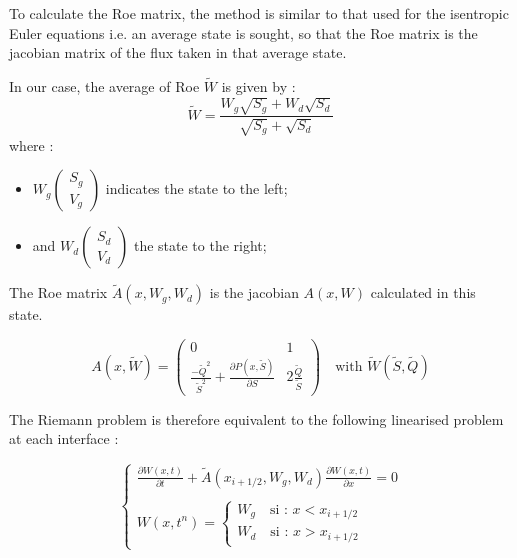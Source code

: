 To calculate the Roe matrix, the method is similar to that used for the isentropic Euler equations i.e. an average state is sought, so that the Roe matrix is the jacobian matrix of the flux taken in that average state.

In our case, the average of Roe $\tilde W$ is given by :
\begin{equation}
 \tilde W = \frac{W_g \sqrt{S_g} + W_d \sqrt{S_d}}{\sqrt{S_g} + \sqrt{S_d}}
\end{equation}
where :
\begin{itemize}
 \item $W_g \left ( \begin{array}{c}
    S_g\\
    V_g
    \end{array} \right )$ indicates the state to the left;
 \item and $W_d \left ( \begin{array}{c}
    S_d\\
    V_d
    \end{array} \right )$ the state to the right;
\end{itemize}

The Roe matrix $\tilde A (x,W_g,W_d)$ is the jacobian $A(x,W)$ calculated in this state.

\begin{equation}
 A(x,\tilde W) = \left ( \begin{array}{cc}
       0 & 1 \\
       \frac{-\tilde{Q}^2}{\tilde{S}^2} + \frac{\partial P(x,\tilde S )}{\partial S} & 2 \frac{\tilde Q}{\tilde S}
    \end{array} \right ) \quad \mbox{with } \tilde W (\tilde S , \tilde Q)
\end{equation}

The Riemann problem is therefore equivalent to the following linearised problem at each interface :

\begin{equation}
 \label{sysW2}
 \left \lbrace
  \begin{array}{l}
   \frac{\partial W(x,t)}{\partial t} + \tilde A(x_{i+1/2},W_g,W_d) \frac{\partial W(x,t)}{\partial x} = 0 \\
   \\
   W(x,t^n) = \left \lbrace
             \begin{array}{l}
               W_{g} \quad \mbox{si : } x < x_{i+1/2} \\
               W_{d} \quad \mbox{si : } x > x_{i+1/2}
             \end{array}
             \right.
  \end{array}
 \right.
\end{equation}

